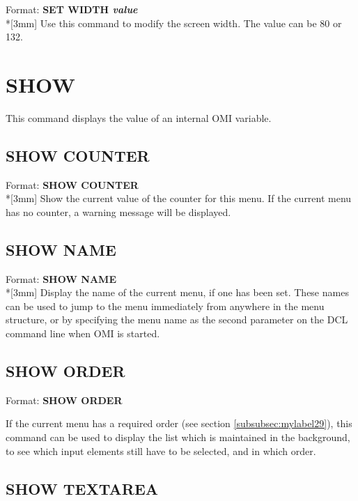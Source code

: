 \documentclass[a4paper]{book}
\newcommand{\vs}{\vspace{3mm}}
\renewcommand{\indent}{\hspace*{5mm}}
\begin{document}
\indent Format: \textbf{SET WIDTH \textit{value}}\\*[3mm]
Use this command to modify the screen width. The value can be 80 or 132.

\section{SHOW}
\label{subsec:showthis}

This command displays the value of an internal OMI variable.

\subsection{SHOW COUNTER}
\label{subsubsec:mylabel80}

\indent Format: \textbf{SHOW COUNTER}\\*[3mm]
Show the current value of the counter for this menu. If the current menu has 
no counter, a warning message will be displayed.

\subsection{SHOW NAME}
\label{subsubsec:mylabel81}

\indent Format: \textbf{SHOW NAME}\\*[3mm]
Display the name of the current menu, if one has been set. These names can 
be used to jump to the menu immediately from anywhere in the menu structure, 
or by specifying the menu name as the second parameter on the DCL command 
line when OMI is started.

\subsection{SHOW ORDER}
\label{subsubsec:mylabel82}

\indent Format: \textbf{SHOW ORDER}

\vs

If the current menu has a required order (see section 
\ref{subsubsec:mylabel29}), this command can be used to display the 
list which is maintained in the background, to see which input elements 
still have to be selected, and in which order.

\subsection{SHOW TEXTAREA}
\label{subsubsec:mylabel83}
\end{document}
